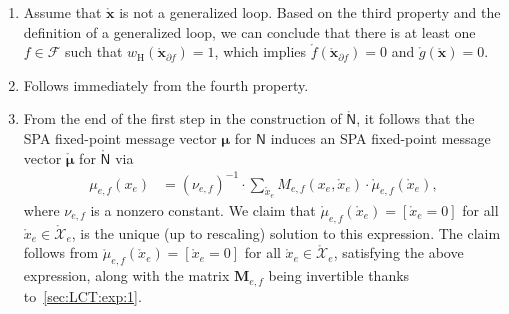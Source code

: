\documentclass[journal]{IEEEtran}
\newcommand{\add}[1]{{\color{black}#1}}
\newcommand{\vect}[1]{ \bm{#1} }
\newcommand{\setF}{ \mathcal{F} }
\newcommand{\setpf}{ \partial f }
\newcommand{\sR}{\mathbb{R}}
\newcommand{\vmu}{ \vect{ \mu } }
\newcommand{\wh}{w_{\mathrm{H}}}
\newcommand{\graphN}{ \mathsf{N} }
\newcommand{\defeq}{ \triangleq }
\newcommand{\etof}{ e,f }
\newcommand{\matr}[1]{\vect{#1}}
\newcommand{\LCTset}[1]{\mathring{\mathcal{#1}}}
\newcommand{\LCTv}[1]{ \mathring{ \vect{#1} } }
\newcommand{\LCT}[1]{ \mathring{#1} }
\newcommand{\efj}{ e,f_j }
\newcommand{\epfi}{ e',f_i }
\newcommand{\setpfi}{ \partial f_{i} }
\newcommand{\xfi}{ \bm{x}_{\setpf_i} }
\newcommand{\LCTvxf}{ \LCTv{x}_{\setpf} }
\newcommand*{\ie}{\textit{i.e.}}
\begin{document}
\begin{appendices}
\begin{enumerate}
\begin{align*}
            \prod_{e' \in \setpfi \setminus e}
            \zeta_{\epfi}
            \right)
            \cdot
            \frac{\kappa_{\efj}}{\zeta_{\efj}}
            \cdot
            [\LCT{x}_e \! = \! 0]                      \\
             & \overset{(g)}{=} 0.
          \end{align*}
          Step $(a)$ follows from~\eqref{sec:LCT:exp:10}.  Step $(b)$ uses
          $\LCT{x}_{e'} = 0$ for $e' \in \setpfi \setminus e$ and
          equations~\eqref{sec:LCT:exp:3} and~\eqref{sec:LCT:exp:4}.  Step
          $(c)$ only reorders terms. Step $(d)$ follows from
          Definition~\ref{def:belief at SPA fixed point for S-NFG} and the
          definition of $ \kappa_{e,f_{j}} $, \ie,
          \begin{align*}
            \kappa_{\efj}
             & \defeq
            \sum_{\xfi}
            f_{i}(\xfi)
            \cdot
            \prod_{e'\in \setpfi \setminus e}
            \mu_{e',f_{i}}(x_{e'}) \in \sR_{>0},
          \end{align*}
          Step $(e)$ follows from~\eqref{sec:LCT:exp:4}.  Step $(f)$ follows
          from~\eqref{sec:LCT:exp:2}, and step $(g)$ uses $\LCT{x}_e \neq 0$.

    \item Assume that $\LCTv{x}$ is not a generalized loop. Based on the
          third property and the definition of a generalized loop, we can
          conclude that there is at least one $f \in \setF$ such that
          $ \wh(\LCTvxf) = 1 $, which implies $\LCT{f}(\LCTvxf) = 0$ and
          $\LCT{g}(\LCTv{x}) = 0$.

    \item Follows immediately from the fourth property.

    \item From the end of the first step in the construction of
          $\LCT{\graphN}$, it follows that the SPA fixed-point message vector
          $\vmu$ for $\graphN$ induces an SPA fixed-point message vector
          $\LCTv{\mu} $ for $\LCT{\graphN}$ via
          \begin{align*}
            \mu_{\etof}(x_e)
             & = ( \nu_{\etof} )^{-1}
            \cdot
            \sum_{\LCT{x}_e}
            M_{\etof}(x_e, \LCT{x}_e)
            \cdot
            \LCT{\mu}_{\etof}(\LCT{x}_e),
          \end{align*}
          where $\nu_{\etof}$ is \add{a nonzero} constant. We claim that
          $\LCT{\mu}_{\etof}(\LCT{x}_e) = [\LCT{x}_e \! = \! 0]$ for all
          $\LCT{x}_e \in \LCTset{X}_e$, is the unique (up to rescaling)
          solution to this expression. The claim follows from
          $\LCT{\mu}_{\etof}(\LCT{x}_e) = [\LCT{x}_e \! = \! 0]$ for all
          $\LCT{x}_e \in \LCTset{X}_e$, satisfying the above expression, along
          with the matrix $ \matr{M}_{\etof} $ being invertible thanks
          to~\eqref{sec:LCT:exp:1}.


\end{enumerate}
\end{appendices}
\end{document}
